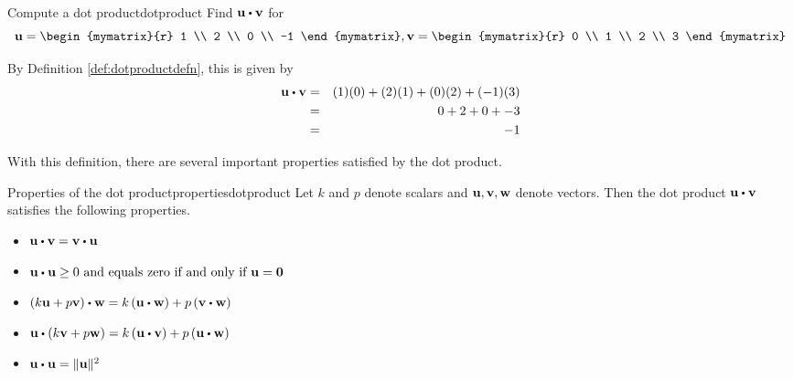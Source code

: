\begin{example}{Compute a dot product}{dotproduct}
Find $\vect{u} \dotprod \vect{v}$ for
\begin{equation*}
\vect{u}
=
\begin{mymatrix}{r}
1 \\
2 \\
0 \\
-1 
\end{mymatrix},
\vect{v}
=
\begin{mymatrix}{r}
0 \\
1 \\
2 \\
3
\end{mymatrix} 
\end{equation*}
\end{example}

\begin{solution}
By Definition \ref{def:dotproductdefn}, this is given by 
\begin{eqnarray*}
\vect{u} \dotprod \vect{v}
&=&
(1)(0) + (2)(1) + (0)(2) + (-1)(3) \\
&=&
0 + 2 + 0 + -3 \\
&=&
-1
\end{eqnarray*}
\end{solution}

With this definition, there are several important properties satisfied
by the dot product.

\begin{proposition}{Properties of the dot product}{propertiesdotproduct}
Let $k $ and $p $  denote scalars and ${\bf u},{\bf v},{\bf w}$ denote vectors.
Then the dot product $\vect{u} \dotprod \vect{v}$ satisfies the following properties.
\begin{itemize}
\item
$\vect{u}\dotprod \vect{v}= \vect{v}\dotprod \vect{u} $
\item
$\vect{u}\dotprod \vect{u}\geq 0 \text{ and equals zero if and only if }\vect{u}=\vect{0}$
\item
$\tup{k\vect{u}+p\vect{v}} \dotprod \vect{w}=k\tup{\vect{u}\dotprod \vect{w}} +p\tup{\vect{v}\dotprod \vect{w}}$
\item
$\vect{u}\dotprod\tup{k\vect{v}+p\vect{w}} =k\tup{
\vect{u}\dotprod \vect{v}} +p\tup{\vect{u}\dotprod \vect{w}}$
\item
$\vect{u}\dotprod \vect{u}=\norm{\vect{u}} ^{2} $
\end{itemize}
\end{proposition}

